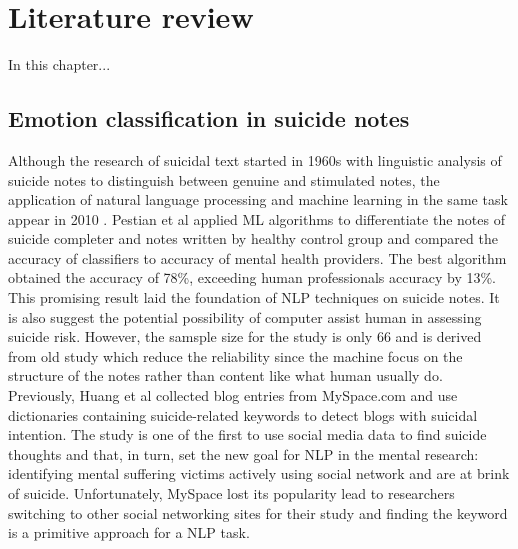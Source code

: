 
\chapter{Literature review}
	\label{chapter:a-new-hope}



\begin{synopsis}
	In this chapter...
\end{synopsis}


\section{Emotion classification in suicide notes}
Although the research of suicidal text started in 1960s with linguistic analysis of suicide notes to distinguish between genuine and stimulated notes, the application of natural language processing  and machine learning in the same task appear in 2010 \cite{Desmet2013}. Pestian et al \cite{Pestian2010} applied ML algorithms to differentiate the notes of suicide completer and notes written by healthy control group and compared the accuracy of classifiers to accuracy of mental health providers. The best algorithm obtained the accuracy of 78\%, exceeding human professionals accuracy by 13\%. This promising result laid the foundation of NLP techniques on suicide notes. It is also suggest the potential possibility of computer assist human in assessing suicide risk. However, the samsple size for the study is only 66 and is derived from old study which reduce the reliability since the machine focus on the structure of the notes rather than content like what human usually do. Previously, Huang et al \cite{Huang2008} collected blog entries from MySpace.com and use dictionaries containing suicide-related keywords to detect blogs with suicidal intention. The study is one of the first to use social media data to find suicide thoughts and that, in turn, set the new goal for NLP in the mental research: identifying mental suffering victims actively using social network and are at brink of suicide. Unfortunately, MySpace lost its popularity lead to researchers switching to other social networking sites for their study and finding the keyword is a primitive approach for a NLP task.\\

